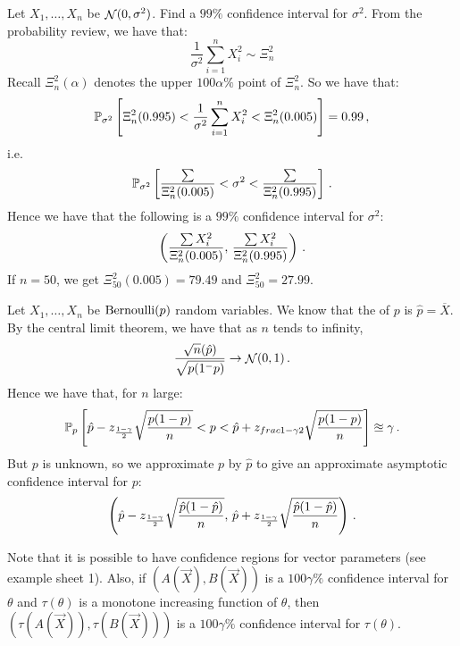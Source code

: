 \begin{example}
Let $X_1, \dotsc, X_n$ be \iid $\mathop{\mathcal{N}}(0, \sigma^2)$. Find a $99\%$ confidence interval for $\sigma^2$.
From the probability review, we have that:
\[
\frac{1}{\sigma^2}\sum_{i=1}^n X_i^2 \sim \Xi^2_n
\]
Recall $\Xi^2_n(\alpha)$ denotes the upper $100\alpha\%$ point of $\Xi^2_n$.
So we have that:
\[
\mathbb{P}_{\sigma^2} \left[ \Xi^2_n(0.995) < \frac{1}{\sigma^2}\sum_{i=1}^n X_i^2 < \Xi^2_n(0.005) \right] = 0.99 \, {,}
\]
i.e.
\[
\mathbb{P}_{\sigma^2} \left[ \frac{\sum}{\Xi^2_n(0.005)} < \sigma^2 < \frac{\sum}{\Xi^2_n(0.995)} \right] \, {.}
\]
Hence we have that the following is a $99\%$ confidence interval for $\sigma^2$:
\[
\left(\frac{\sum X_i^2}{\Xi^2_n(0.005)}, \, \frac{\sum X_i^2}{\Xi^2_n(0.995)} \right) \, {.}
\]
If $n = 50$, we get $\Xi^2_{50}(0.005) = 79.49$ and $\Xi^2_{50} = 27.99$.
\end{example}

\begin{example}
Let $X_1, \dotsc, X_n$ be \iid $\operatorname{Bernoulli}(p)$ random variables. We know that the \mle of $p$ is $\hat{p} = \overline{X}$.
By the central limit theorem, we have that as $n$ tends to infinity,
\[
\frac{\sqrt{n}(\hat{p})}{\sqrt{p(1^-p)}} \rightarrow \mathop{\mathcal{N}}(0, 1) \, {.}
\]
Hence we have that, for $n$ large:
\[
\mathbb{P}_p \left[ \hat{p} - z_{\frac{1-\gamma}{2}}\sqrt{\frac{p(1-p)}{n}} < p < \hat{p} + z_{frac{1-\gamma}{2}} \sqrt{\frac{p(1-p)}{n}} \right] \approxeq \gamma \, {.}
\]
But $p$ is unknown, so we approximate $p$ by $\hat{p}$ to give an approximate asymptotic confidence interval for $p$:
\[
\left( \hat{p} - z_{\frac{1-\gamma}{2}}\sqrt{\frac{\hat{p}(1-\hat{p})}{n}}, \, \hat{p} + z_{\frac{1-\gamma}{2}}\sqrt{\frac{\hat{p}(1-\hat{p})}{n}} \right) \, {.}
\]
\end{example}

Note that it is possible to have confidence regions for vector parameters (see example sheet 1). Also, if $\left(A(\vec{X}), B(\vec{X})\right)$ is a $100\gamma\%$ confidence interval for $\theta$ and $\tau(\theta)$ is a monotone increasing function of $\theta$, then $\left(\tau(A(\vec{X})), \tau(B(\vec{X}))\right)$ is a $100\gamma\%$ confidence interval for $\tau(\theta)$.



